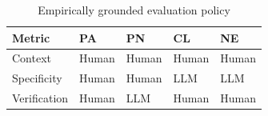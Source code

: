 \begin{table}
\caption{Empirically grounded evaluation policy}
\label{tab:rq1-policy}
\begin{tabular}{lllll}
\toprule
Metric & PA & PN & CL & NE \\
\midrule
Context & Human & Human & Human & Human \\
Specificity & Human & Human & LLM & LLM \\
Verification & Human & LLM & Human & Human \\
\bottomrule
\end{tabular}
\end{table}
